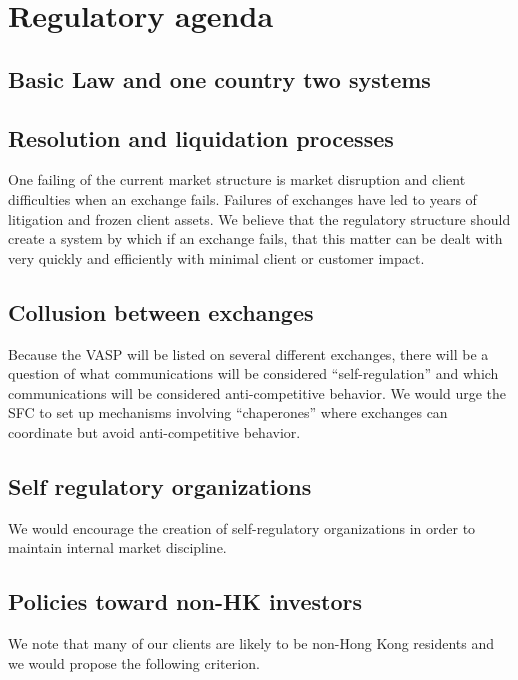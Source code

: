 \section{Regulatory agenda}

\subsection{Basic Law and one country two systems}


\subsection{Resolution and liquidation processes}

One failing of the current market structure is market disruption and
client difficulties when an exchange fails.  Failures of exchanges
have led to years of litigation and frozen client assets.  We believe
that the regulatory structure should create a system by which if an
exchange fails, that this matter can be dealt with very quickly and
efficiently with minimal client or customer impact.

\subsection{Collusion between exchanges}

Because the VASP will be listed on several different exchanges, there
will be a question of what communications will be considered
``self-regulation'' and which communications will be considered
anti-competitive behavior.  We would urge the SFC to set up mechanisms
involving ``chaperones'' where exchanges can coordinate but avoid
anti-competitive behavior.

\subsection{Self regulatory organizations}
We would encourage the creation of self-regulatory organizations in
order to maintain internal market discipline.  

\subsection{Policies toward non-HK investors}

We note that many of our clients are likely to be non-Hong Kong
residents and we would propose the following criterion.


